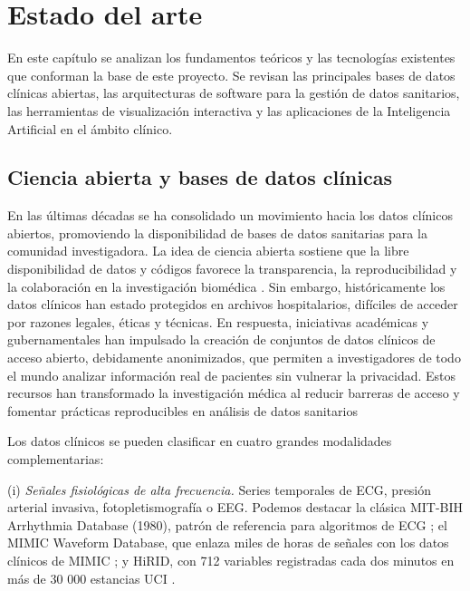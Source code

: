 \chapter{Estado del arte}

En este capítulo se analizan los fundamentos teóricos y las tecnologías existentes que conforman la base de este proyecto. Se revisan las principales bases de datos clínicas abiertas, las arquitecturas de software para la gestión de datos sanitarios, las herramientas de visualización interactiva y las aplicaciones de la Inteligencia Artificial en el ámbito clínico.

\section{Ciencia abierta y bases de datos clínicas}

En las últimas décadas se ha consolidado un movimiento hacia los datos clínicos abiertos, promoviendo la disponibilidad de bases de datos sanitarias para la comunidad investigadora. La idea de ciencia abierta sostiene que la libre disponibilidad de datos y códigos favorece la transparencia, la reproducibilidad y la colaboración en la investigación biomédica \cite{Lvovs2025_balancing}. Sin embargo, históricamente los datos clínicos han estado protegidos en archivos hospitalarios, difíciles de acceder por razones legales, éticas y técnicas. En respuesta, iniciativas académicas y gubernamentales han impulsado la creación de conjuntos de datos clínicos de acceso abierto, debidamente anonimizados, que permiten a investigadores de todo el mundo analizar información real de pacientes sin vulnerar la privacidad. Estos recursos han transformado la investigación médica al reducir barreras de acceso y fomentar prácticas reproducibles en análisis de datos sanitarios

\newpage
Los datos clínicos se pueden clasificar en cuatro grandes modalidades complementarias:


(i) \emph{Señales fisiológicas de alta frecuencia.} Series temporales de ECG, presión arterial invasiva, fotopletismografía o EEG. Podemos destacar la clásica MIT-BIH Arrhythmia Database (1980), patrón de referencia para algoritmos de ECG \cite{Impact_MIT-BIH}; el MIMIC Waveform Database, que enlaza miles de horas de señales con los datos clínicos de MIMIC \cite{Moody2022_MIMICIVWaveform}; y HiRID, con 712 variables registradas cada dos minutos en más de 30 000 estancias UCI \cite{Faltys2021HiRID}.

